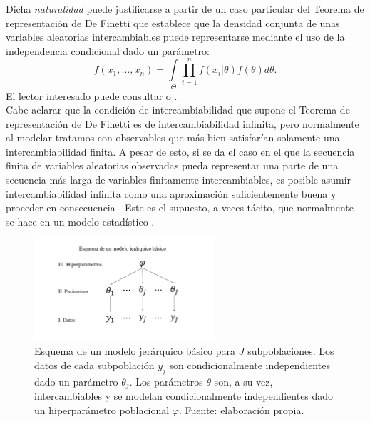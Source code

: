 Dicha \textit{naturalidad} puede justificarse a partir de un caso particular del Teorema de representación de De Finetti que establece que la densidad conjunta de unas variables aleatorias intercambiables puede representarse mediante el uso de la independencia condicional dado un parámetro: 
\begin{equation*}
f(x_1,\dots,x_n) = \int\limits_\Theta \prod\limits_{i=1}^n f(x_i|\theta)f(\theta)d\theta.
\end{equation*} 
El lector interesado puede consultar \textcite{GP98} o \textcite{BernardoSmith00}.\\ 

Cabe aclarar que la condición de intercambiabilidad que supone el Teorema de representación de De Finetti es de intercambiabilidad infinita, pero normalmente al modelar tratamos con observables que más bien satisfarían solamente una intercambiabilidad finita. A pesar de esto, si se da el caso en el que la secuencia finita de variables aleatorias observadas pueda representar una parte de una secuencia más larga de variables finitamente intercambiables, es posible asumir intercambiabilidad infinita como una aproximación suficientemente buena y proceder en consecuencia \parencite{BernardoSmith00}. Este es el supuesto, a veces tácito, que normalmente se hace en un modelo estadístico \parencite{Gelman13}.\\

\begin{figure}[h]
	\centering
	\includegraphics[width=0.6\textwidth]{Figs/Bayes/Modelo_Jer}
	\caption{Esquema de un modelo jerárquico básico para $J$ subpoblaciones. Los datos de cada subpoblación $y_j$ son condicionalmente independientes dado un parámetro $\theta_j$. Los parámetros $\theta$ son, a su vez, intercambiables y se modelan condicionalmente independientes dado un hiperparámetro poblacional $\varphi$. Fuente: elaboración propia.}
	\label{fig:Esquema_Modelo_Jer}	
\end{figure}

